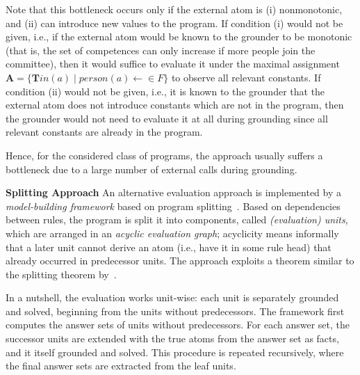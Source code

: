 \documentclass[11pt,fleqn,twoside]{article}
\newcommand{\leanparagraph}[1]{\smallskip\noindent\textbf{#1}}
\newcommand{\T}{\mathbf{T}}
\newcommand{\Assignment}{\ensuremath{\mathbf{A}}}
\begin{document}
			Note that this bottleneck occurs only if the external atom is (i) nonmonotonic, and (ii) can introduce new values to the program.
			If condition (i) would not be given, i.e., if the external atom would be known to the grounder to be monotonic
			(that is, the set of competences can only increase if more people join the committee),
			then it would suffice to evaluate it under the maximal assignment $\Assignment = \{ \T \mathit{in}(a) \mid \mathit{person}(a) \leftarrow \in F \}$
			to observe all relevant constants.
			If condition (ii) would not be given, i.e., it is known to the grounder that the external atom does not introduce constants which are not in the program,
			then the grounder would not need to evaluate it at all during grounding since all relevant constants are already in the program.

			Hence, for the considered class of programs, the approach usually suffers a bottleneck due to a large number of external calls during grounding.
			
			\leanparagraph{Splitting Approach}
			An alternative evaluation approach is implemented by a \emph{model-building framework} based on program splitting~\cite{efikrs2016-tplp}.
			Based on dependencies between rules, the program is split it into components, called \emph{(evaluation) units},
			which are arranged in an \emph{acyclic evaluation graph};
			acyclicity means informally that a later unit cannot derive an atom (i.e., have it in some rule head)
			that already occurred in predecessor units. The approach exploits a theorem similar to the splitting theorem by~.
			
			In a nutshell, the evaluation works unit-wise: each unit is separately grounded and solved, beginning from the units without predecessors.
			The framework first computes the answer sets of units without predecessors.
			For each answer set, the successor units are extended with the true atoms from the answer set as facts,
			and it itself grounded and solved. This procedure is repeated recursively,
			where the final answer sets are extracted from the leaf units.
\end{document}
